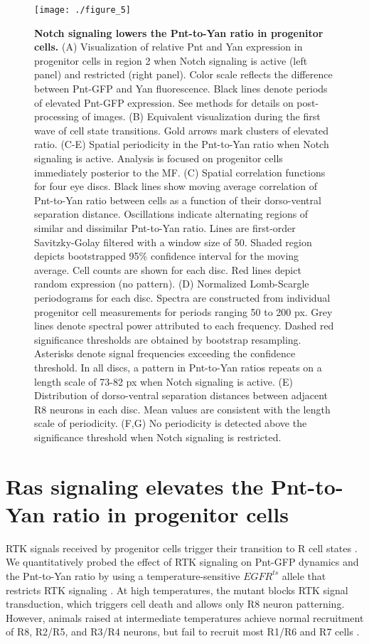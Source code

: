 \begin{figure}[t]
\centering
\texttt{[image: ./figure\_5]}
\caption[Notch signaling lowers the Pnt-to-Yan ratio in progenitor cells.]{\textbf{Notch signaling lowers the Pnt-to-Yan ratio in progenitor cells.} (A) Visualization of relative Pnt and Yan expression in progenitor cells in region 2 when Notch signaling is active (left panel) and restricted (right panel). Color scale reflects the difference between Pnt-GFP and Yan fluorescence. Black lines denote periods of elevated Pnt-GFP expression. See methods for details on post-processing of images. (B) Equivalent visualization during the first wave of cell state transitions. Gold arrows mark clusters of elevated ratio. (C-E) Spatial periodicity in the Pnt-to-Yan ratio when Notch signaling is active. Analysis is focused on progenitor cells immediately posterior to the MF. (C) Spatial correlation functions for four eye discs. Black lines show moving average correlation of Pnt-to-Yan ratio between cells as a function of their dorso-ventral separation distance. Oscillations indicate alternating regions of similar and dissimilar Pnt-to-Yan ratio. Lines are first-order Savitzky-Golay filtered with a window size of 50. Shaded region depicts bootstrapped 95\% confidence interval for the moving average. Cell counts are shown for each disc. Red lines depict random expression (no pattern). (D) Normalized Lomb-Scargle periodograms for each disc. Spectra are constructed from individual progenitor cell measurements for periods ranging 50 to 200 px. Grey lines denote spectral power attributed to each frequency. Dashed red significance thresholds are obtained by bootstrap resampling. Asterisks denote signal frequencies exceeding the confidence threshold. In all discs, a pattern in Pnt-to-Yan ratios repeats on a length scale of 73-82 px when Notch signaling is active. (E) Distribution of dorso-ventral separation distances between adjacent R8 neurons in each disc. Mean values are consistent with the length scale of periodicity. (F,G) No periodicity is detected above the significance threshold when Notch signaling is restricted.}
\label{fig:ratio:fig5}
\end{figure}

\section{Ras signaling elevates the Pnt-to-Yan ratio in progenitor cells}

RTK signals received by progenitor cells trigger their transition to R cell states \cite{Freeman1996}. We quantitatively probed the effect of RTK signaling on Pnt-GFP dynamics and the Pnt-to-Yan ratio by using a temperature-sensitive $EGFR^{ts}$ allele that restricts RTK signaling \cite{Kumar1998}. At high temperatures, the mutant blocks RTK signal transduction, which triggers cell death and allows only R8 neuron patterning. However, animals raised at intermediate temperatures achieve normal recruitment of R8, R2/R5, and R3/R4 neurons, but fail to recruit most R1/R6 and R7 cells \cite{Pelaez2015a}.

